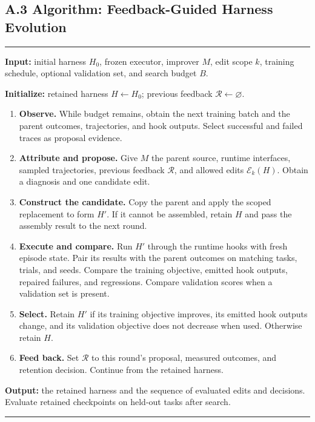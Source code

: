 \subsection*{A.3 Algorithm: Feedback-Guided Harness Evolution}
\label{alg:harness}
\noindent\begin{minipage}{\linewidth}\small
\noindent\rule{\linewidth}{.5pt}\par
\textbf{Input:} initial harness $H_0$, frozen executor, improver $M$, edit scope $k$, training schedule, optional validation set, and search budget $B$.\par
\textbf{Initialize:} retained harness $H\leftarrow H_0$; previous feedback $\mathcal R\leftarrow\varnothing$.\par
\begin{enumerate}
\item \textbf{Observe.} While budget remains, obtain the next training batch and the parent outcomes, trajectories, and hook outputs. Select successful and failed traces as proposal evidence.
\item \textbf{Attribute and propose.} Give $M$ the parent source, runtime interfaces, sampled trajectories, previous feedback $\mathcal R$, and allowed edits $\mathcal E_k(H)$. Obtain a diagnosis and one candidate edit.
\item \textbf{Construct the candidate.} Copy the parent and apply the scoped replacement to form $H'$. If it cannot be assembled, retain $H$ and pass the assembly result to the next round.
\item \textbf{Execute and compare.} Run $H'$ through the runtime hooks with fresh episode state. Pair its results with the parent outcomes on matching tasks, trials, and seeds. Compare the training objective, emitted hook outputs, repaired failures, and regressions. Compare validation scores when a validation set is present.
\item \textbf{Select.} Retain $H'$ if its training objective improves, its emitted hook outputs change, and its validation objective does not decrease when used. Otherwise retain $H$.
\item \textbf{Feed back.} Set $\mathcal R$ to this round's proposal, measured outcomes, and retention decision. Continue from the retained harness.
\end{enumerate}
\textbf{Output:} the retained harness and the sequence of evaluated edits and decisions. Evaluate retained checkpoints on held-out tasks after search.\par
\noindent\rule{\linewidth}{.5pt}\par
\end{minipage}

